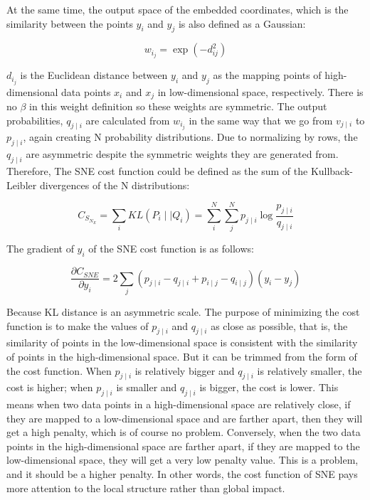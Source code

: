 \noindent At the same time, the output space of the embedded coordinates, which is the similarity between the points $y_i$ and $y_j$ is also defined as a Gaussian:

\begin{equation*}
    {{w_i_j} = \exp {(-d^2_{ij})} }
\end{equation*}

\noindent $d_i_j$ is the Euclidean distance between $y_i$ and $y_j$ as the mapping points of high-dimensional data points $x_i$ and $x_j$ in low-dimensional space, respectively. There is no $\beta$ in this weight definition so these weights are symmetric. The output probabilities, $q_{j\mid i}$ are calculated from $w_i_j$ in the same way that we go from ${v_{j\mid i}}$ to ${p_{j\mid i}}$, again creating N probability distributions. Due to normalizing by rows, the $q_{j\mid i}$ are asymmetric despite the symmetric weights they are generated from.\\

\noindent Therefore, The SNE cost function could be defined as the sum of the Kullback-Leibler divergences of the N distributions:

\begin{equation*}
    {C_S_N_E} = {\sum_i KL(P_i \mid \mid Q_i)} =  { {\sum_i^N} {\sum_j^N} {p_{j\mid i}} \log \frac{p_{j\mid i}}{q_{j\mid i}} }
\end{equation*}

\noindent The gradient of $y_i$ of the SNE cost function is as follows:

\begin{equation*}
\frac{\partial C_{SNE}}{\partial y_i} = 2\sum_j(p_{j \mid i} - q_{j \mid i} + p_{i \mid j} - q_{i \mid j} )(y_i - y_j)
\end{equation*}

\noindent Because KL distance is an asymmetric scale. The purpose of minimizing the cost function is to make the values of $p_{j∣i}$ and $q_{j∣i}$ as close as possible,  that is, the similarity of points in the low-dimensional space is consistent with the similarity of points in the high-dimensional space. But it can be trimmed from the form of the cost function. When $p_{j∣i}$ is relatively bigger and $q_{j∣i}$  is relatively smaller, the cost is higher; when $p_{j∣i}$ is smaller and $q_{j∣i}$ is bigger, the cost is lower. This means when two data points in a high-dimensional space are relatively close, if they are mapped to a low-dimensional space and are farther apart, then they will get a high penalty, which is of course no problem. Conversely, when the two data points in the high-dimensional space are farther apart, if they are mapped to the low-dimensional space, they will get a very low penalty value. This is a problem, and it should be a higher penalty. In other words, the cost function of SNE pays more attention to the local structure rather than global impact.

